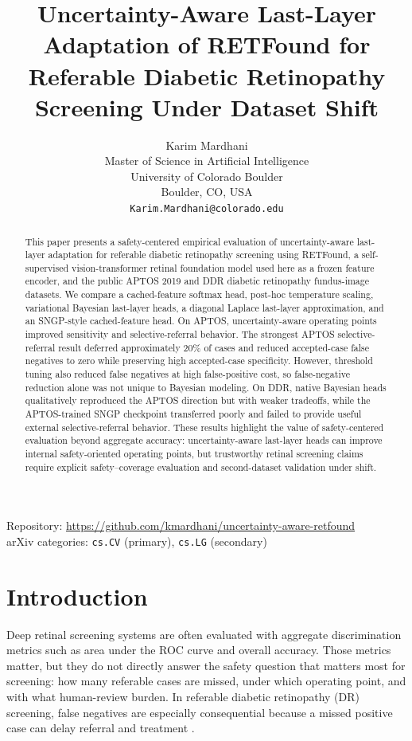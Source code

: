 \documentclass[11pt]{article}
\title{Uncertainty-Aware Last-Layer Adaptation of RETFound for Referable Diabetic Retinopathy Screening Under Dataset Shift}
\author{
Karim Mardhani \\
Master of Science in Artificial Intelligence \\
University of Colorado Boulder \\
Boulder, CO, USA \\
\texttt{Karim.Mardhani@colorado.edu}
}
\date{}
\begin{document}
\maketitle

\begin{center}
\small
Repository: \url{https://github.com/kmardhani/uncertainty-aware-retfound} \\
arXiv categories: \texttt{cs.CV} (primary), \texttt{cs.LG} (secondary)
\end{center}

\begin{abstract}
This paper presents a safety-centered empirical evaluation of uncertainty-aware last-layer adaptation for referable diabetic retinopathy screening using RETFound, a self-supervised vision-transformer retinal foundation model used here as a frozen feature encoder, and the public APTOS 2019 and DDR diabetic retinopathy fundus-image datasets. We compare a cached-feature softmax head, post-hoc temperature scaling, variational Bayesian last-layer heads, a diagonal Laplace last-layer approximation, and an SNGP-style cached-feature head. On APTOS, uncertainty-aware operating points improved sensitivity and selective-referral behavior. The strongest APTOS selective-referral result deferred approximately 20\% of cases and reduced accepted-case false negatives to zero while preserving high accepted-case specificity. However, threshold tuning also reduced false negatives at high false-positive cost, so false-negative reduction alone was not unique to Bayesian modeling. On DDR, native Bayesian heads qualitatively reproduced the APTOS direction but with weaker tradeoffs, while the APTOS-trained SNGP checkpoint transferred poorly and failed to provide useful external selective-referral behavior. These results highlight the value of safety-centered evaluation beyond aggregate accuracy: uncertainty-aware last-layer heads can improve internal safety-oriented operating points, but trustworthy retinal screening claims require explicit safety--coverage evaluation and second-dataset validation under shift.
\end{abstract}

\section{Introduction}
Deep retinal screening systems are often evaluated with aggregate discrimination metrics such as area under the ROC curve and overall accuracy. Those metrics matter, but they do not directly answer the safety question that matters most for screening: how many referable cases are missed, under which operating point, and with what human-review burden. In referable diabetic retinopathy (DR) screening, false negatives are especially consequential because a missed positive case can delay referral and treatment \citep{gulshan2016development,ting2017development}.
\end{document}
